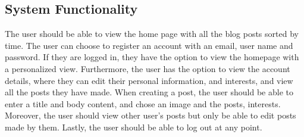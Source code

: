 \subsection{System Functionality}
The user should be able to view the home page with all the blog posts sorted by time. The user can choose to register an account with an email, user name and password. If they are logged in, they have the option to view the homepage with a personalized view. Furthermore, the user has the option to view the account details, where they can edit their personal information, and interests, and view all the posts they have made. When creating a post, the user should be able to enter a title and body content, and chose an image and the posts, interests. Moreover, the user should view other user's posts but only be able to edit posts made by them. Lastly, the user should be able to log out at any point.
